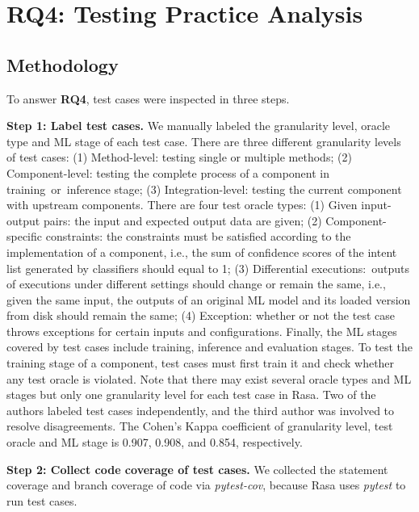 
\section{RQ4: Testing Practice Analysis}
\vspace{-3pt}
\label{sec:test_case}

\subsection{Methodology}

To answer \textbf{RQ4}, test cases were inspected in three steps.

\textbf{Step 1: Label test cases.} We manually labeled the granularity level, oracle type and ML stage of each test case.
There are three different granularity levels of test cases: (1) Method-level: testing single or multiple methods; (2) Component-level: testing the complete process of a component in training~or~inference stage; (3) Integration-level: testing the current component with upstream components. 
There are four test oracle types: (1) Given input-output pairs: the input and expected output data are given; (2) Component-specific constraints: the constraints must be satisfied according to the implementation of a component, i.e., the sum of confidence scores of the intent list generated by classifiers should equal to 1; (3) Differential executions:~outputs of executions under different settings should change or remain the same, i.e., given the same input, the outputs of an original ML model and its loaded version from disk should remain the same; (4) Exception: whether or not the test case throws exceptions for certain inputs and configurations. 
Finally, the ML stages covered by test cases include training, inference and evaluation stages.
To test the training stage of a component, test cases must first train it and check whether any test oracle is violated.
Note that there may exist several oracle types and ML stages but only one granularity level for each test case in Rasa.
Two of the authors labeled test cases independently, and the third author was involved to resolve disagreements. The Cohen's Kappa coefficient of granularity level, test oracle and ML stage is 0.907, 0.908, and 0.854, respectively. 

\textbf{Step 2: Collect code coverage of test cases.} We collected the statement coverage and branch coverage of code via \textit{pytest-cov}, because Rasa uses \textit{pytest} to run test cases. 


